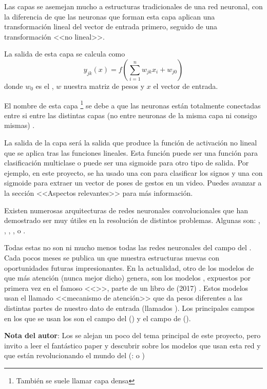 \begin{itemize}
\begin{enumerate}
                Las capas  se asemejan mucho a estructuras tradicionales de una red neuronal, con la diferencia de que las neuronas que forman esta capa aplican una transformación lineal del vector de entrada primero, seguido de una transformación <<no lineal>>.

                La salida de esta capa se calcula como \[
                  y_{j k}(x)=f\left(\sum_{i=1}^{n} w_{j k} x_{i}+w_{j 0}\right)
                \] donde $w_0$ es el , $w$ nuestra matriz de pesos y $x$ el vector de entrada.

                El nombre de esta capa \footnote{También se suele llamar capa densa} se debe a que las neuronas están totalmente conectadas entre si entre las distintas capas (no entre neuronas de la misma capa ni consigo mismas) .

                La salida de la capa  será la salida que produce la función de activación no lineal que se aplica tras las funciones lineales. Esta función puede ser una función  para clasificación multiclase o puede ser una sigmoide para otro tipo de salida. Por ejemplo, en este proyecto, se ha usado una  con  para clasificar los signos y una  con sigmoide para extraer un vector de poses de gestos en un video. Puedes avanzar a la sección <<Aspectos relevantes>> para más información.
        \end{enumerate}

        Existen numerosas arquitecturas de redes neuronales convolucionales que han demostrado ser muy útiles en la resolución de distintos problemas. Algunas son:  , ,  ,  ,   o  .
\end{itemize}

Todas estas no son ni mucho menos todas las redes neuronales del campo del . Cada pocos meses se publica un  que muestra estructuras nuevas con oportunidades futuras impresionantes. En la actualidad, otro de los modelos de  que más atención (nunca mejor dicho) genera, son los modelos , expuestos por primera vez en el famoso  <<>>, parte de un libro de (2017) . Estos modelos usan el llamado <<mecanismo de atención>> que da pesos diferentes a las distintas partes de nuestro dato de entrada (llamados ). Los principales campos en los que se usan los  son el campo del  () y el campo de  ().

\textbf{Nota del autor}: Los  se alejan un poco del tema principal de este proyecto, pero invito a leer el fantástico paper y descubrir sobre los modelos que usan esta red y que están revolucionando el mundo del  (\pe:  o )